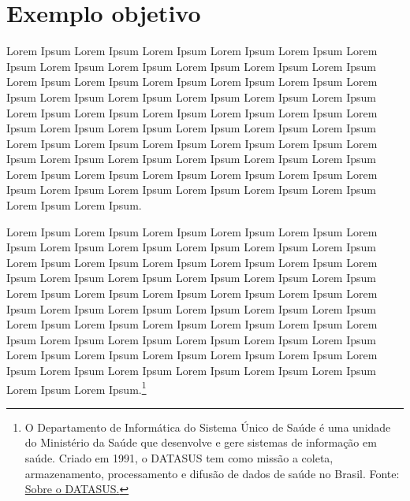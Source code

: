 \section{Exemplo objetivo}

Lorem Ipsum Lorem Ipsum Lorem Ipsum Lorem Ipsum Lorem Ipsum Lorem Ipsum Lorem Ipsum Lorem Ipsum Lorem Ipsum Lorem Ipsum Lorem Ipsum Lorem Ipsum Lorem Ipsum Lorem Ipsum Lorem Ipsum Lorem Ipsum Lorem Ipsum Lorem Ipsum Lorem Ipsum Lorem Ipsum Lorem Ipsum Lorem Ipsum Lorem Ipsum Lorem Ipsum Lorem Ipsum Lorem Ipsum Lorem Ipsum Lorem Ipsum Lorem Ipsum Lorem Ipsum Lorem Ipsum Lorem Ipsum Lorem Ipsum Lorem Ipsum Lorem Ipsum Lorem Ipsum Lorem Ipsum Lorem Ipsum Lorem Ipsum Lorem Ipsum Lorem Ipsum Lorem Ipsum Lorem Ipsum Lorem Ipsum Lorem Ipsum Lorem Ipsum Lorem Ipsum Lorem Ipsum Lorem Ipsum Lorem Ipsum Lorem Ipsum Lorem Ipsum Lorem Ipsum Lorem Ipsum Lorem Ipsum Lorem Ipsum Lorem Ipsum.

Lorem Ipsum Lorem Ipsum Lorem Ipsum Lorem Ipsum Lorem Ipsum Lorem Ipsum Lorem Ipsum Lorem Ipsum Lorem Ipsum Lorem Ipsum Lorem Ipsum Lorem Ipsum Lorem Ipsum Lorem Ipsum Lorem Ipsum Lorem Ipsum Lorem Ipsum Lorem Ipsum Lorem Ipsum Lorem Ipsum Lorem Ipsum Lorem Ipsum Lorem Ipsum Lorem Ipsum Lorem Ipsum Lorem Ipsum Lorem Ipsum Lorem Ipsum Lorem Ipsum Lorem Ipsum Lorem Ipsum Lorem Ipsum Lorem Ipsum Lorem Ipsum Lorem Ipsum Lorem Ipsum Lorem Ipsum Lorem Ipsum Lorem Ipsum Lorem Ipsum Lorem Ipsum Lorem Ipsum Lorem Ipsum Lorem Ipsum Lorem Ipsum Lorem Ipsum Lorem Ipsum Lorem Ipsum Lorem Ipsum Lorem Ipsum Lorem Ipsum Lorem Ipsum Lorem Ipsum Lorem Ipsum Lorem Ipsum Lorem Ipsum Lorem Ipsum.\footnote{O Departamento de Informática do Sistema Único de Saúde é uma unidade do Ministério da Saúde que desenvolve e gere sistemas de informação em saúde. Criado em 1991, o DATASUS tem como missão a coleta, armazenamento, processamento e difusão de dados de saúde no Brasil. Fonte: \href{https://datasus.saude.gov.br/sobre-o-datasus/}{Sobre o DATASUS.}}


